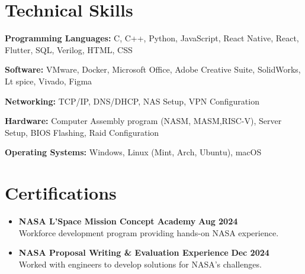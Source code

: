 \documentclass[letterpaper,11pt]{article}
\begin{document}
\section{Technical Skills}
\begin{itemize}[left=0.15in, label={}]
    \small{
    \item \textbf{Programming Languages:} C, C++, Python, JavaScript, React Native, React, Flutter, SQL, Verilog, HTML, CSS
    \item \textbf{Software:} VMware, Docker, Microsoft Office, Adobe Creative Suite, SolidWorks, Lt spice, Vivado, Figma
    \item \textbf{Networking:} TCP/IP, DNS/DHCP, NAS Setup, VPN Configuration
    \item \textbf{Hardware:} Computer Assembly program (NASM, MASM,RISC-V), Server Setup, BIOS Flashing, Raid Configuration
    \item \textbf{Operating Systems:} Windows, Linux (Mint, Arch, Ubuntu), macOS
    }
\end{itemize}

\section{Certifications}
\begin{itemize}[leftmargin=0.15in, label={}]
    \item \textbf{NASA L’Space Mission Concept Academy} \hfill \textbf{Aug 2024} \\
    Workforce development program providing hands-on NASA experience.

    \item \textbf{NASA Proposal Writing \& Evaluation Experience} \hfill \textbf{Dec 2024} \\ 
    Worked with engineers to develop solutions for NASA’s challenges.
\end{itemize}
\end{document}
